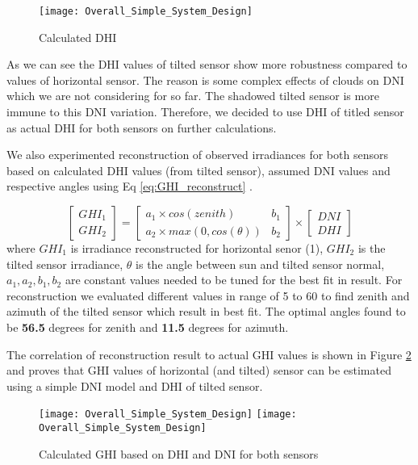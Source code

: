 \begin{figure}[h]
\caption{Calculated DHI}
\label{fig:calc_DHI_day}
\texttt{[image: Overall\_Simple\_System\_Design]}
\centering
\end{figure}

As we can see the DHI values of tilted sensor show more robustness compared to values of horizontal sensor. The reason is some complex effects of clouds on DNI which we are not considering for so far. The shadowed tilted sensor is more immune to this DNI variation. Therefore, we decided to use DHI of titled sensor as actual DHI for both sensors on further calculations.

We also experimented reconstruction of observed irradiances for both sensors based on calculated DHI values (from tilted sensor), assumed DNI values and respective angles using Eq \ref{eq:GHI_reconstruct} . 

\begin{equation}
\label{eq:GHI_reconstruct}
\left[ \begin{array}{c} GHI_1 \\ GHI_2 \end{array} \right] = \begin{bmatrix} a_1 \times cos(zenith) & b_1 \\ a_2 \times max(0,cos(\theta)) & b_2 \end{bmatrix} \times \left[ \begin{array}{c} DNI \\ DHI \end{array} \right]
\end{equation}
where $GHI_1$ is irradiance reconstructed for horizontal senor (1), $GHI_2$ is the tilted sensor irradiance, $\theta$ is the angle between sun and tilted sensor normal, $a_1, a_2, b_1, b_2$ are constant values needed to be tuned for the best fit in result. For reconstruction we evaluated different values in range of 5 to 60 to find zenith and azimuth of the tilted sensor which result in best fit. The optimal angles found to be \textbf{56.5} degrees for zenith and \textbf{11.5} degrees for azimuth.

The correlation of reconstruction result to actual GHI values is shown in Figure \ref{fig:GHI_reconstruct_result} and proves that GHI values of horizontal (and tilted) sensor can be estimated using a simple DNI model and DHI of tilted sensor.


\begin{figure}[h]
\caption{Calculated GHI based on DHI and DNI for both sensors}
\label{fig:GHI_reconstruct_result}
\texttt{[image: Overall\_Simple\_System\_Design]}
\texttt{[image: Overall\_Simple\_System\_Design]}
\centering
\end{figure}

